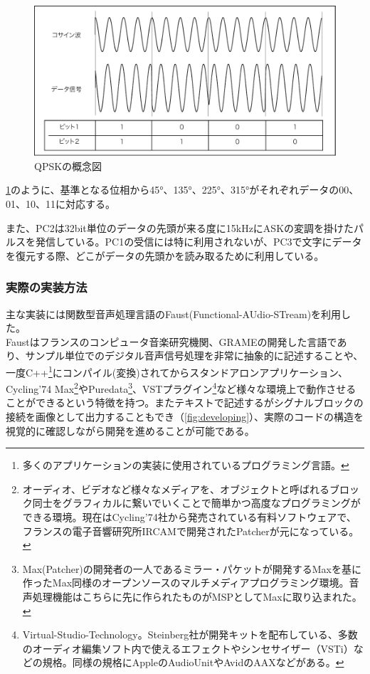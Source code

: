 \documentclass[a4paper,report]{jsbook}
\begin{document}
\begin{figure}[htbp]
\centering
\includegraphics[width=1.00000\textwidth]{./img/qpsk_setsumei.pdf}
\caption{QPSKの概念図\label{fig:qpsk}}
\end{figure}

\cref{fig:qpsk}のように、基準となる位相から45°、135°、225°、315°がそれぞれデータの00、01、10、11に対応する。

また、PC2は32bit単位のデータの先頭が来る度に15kHzにASKの変調を掛けたパルスを発信している。PC1の受信には特に利用されないが、PC3で文字にデータを復元する際、どこがデータの先頭かを読み取るために利用している。

\subsubsection{実際の実装方法}\label{ux5b9fux969bux306eux5b9fux88c5ux65b9ux6cd5}

主な実装には関数型音声処理言語のFaust(Functional-AUdio-STream)を利用した。\\
Faustはフランスのコンピュータ音楽研究機関、GRAMEの開発した言語であり、サンプル単位でのデジタル音声信号処理を非常に抽象的に記述することや、一度C++\footnote{多くのアプリケーションの実装に使用されているプログラミング言語。}にコンパイル(変換)されてからスタンドアロンアプリケーション、Cycling'74
Max\footnote{オーディオ、ビデオなど様々なメディアを、オブジェクトと呼ばれるブロック同士をグラフィカルに繋いでいくことで簡単かつ高度なプログラミングができる環境。現在はCycling'74社から発売されている有料ソフトウェアで、フランスの電子音響研究所IRCAMで開発されたPatcherが元になっている。}やPuredata\footnote{Max(Patcher)の開発者の一人であるミラー・パケットが開発するMaxを基に作ったMax同様のオープンソースのマルチメディアプログラミング環境。音声処理機能はこちらに先に作られたものがMSPとしてMaxに取り込まれた。}、VSTプラグイン\footnote{Virtual-Studio-Technology。Steinberg社が開発キットを配布している、多数のオーディオ編集ソフト内で使えるエフェクトやシンセサイザー（VSTi）などの規格。同様の規格にAppleのAudioUnitやAvidのAAXなどがある。}など様々な環境上で動作させることができるという特徴を持つ。またテキストで記述するがシグナルブロックの接続を画像として出力することもでき（\cref{fig:developing}）、実際のコードの構造を視覚的に確認しながら開発を進めることが可能である。
\end{document}
